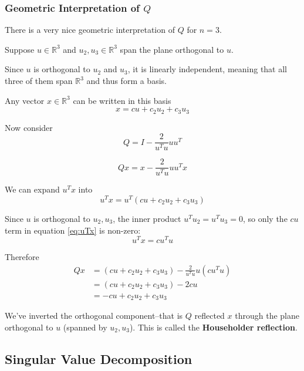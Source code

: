 \documentclass[12pt,letterpaper]{article}
\newcommand{\R}{\mathbb{R}}
\begin{document}
\subsubsection{Geometric Interpretation of $Q$}
There is a very nice geometric interpretation of $Q$ for $n=3$.

Suppose $u \in \R^3$ and $u_2, u_3 \in \R^3$ span the plane orthogonal to $u$.

Since $u$ is orthogonal to $u_2$ and $u_3$, it is linearly independent, meaning that all three of them span $\R^3$ and thus form a basis.

Any vector $x \in \R^3$ can be written in this basis
\begin{equation}
	x = c u + c_2 u_2 + c_3 u_3
\end{equation}

Now consider
\begin{equation}
	Q = I - \frac{2}{u^T u} u u^T
\end{equation}

\begin{equation}
	Qx = x - \frac{2}{u^T u} u u^T x
\end{equation}

We can expand $u^T x$ into
\begin{equation} \label{eq:uTx}
	u^T x = u^T (c u + c_2 u_2 + c_3 u_3)
\end{equation}

Since $u$ is orthogonal to $u_2, u_3$, the inner product $u^T u_2 = u^T u_3 = 0$, so only the $cu$ term in equation \ref{eq:uTx} is non-zero:
\begin{equation}
	u^T x = c u^T u
\end{equation}

Therefore
\begin{align}
	Qx &= (cu + c_2 u_2 + c_3 u_3) - \frac{2}{u^T u} u (c u^T u) \\
	&= (cu + c_2 u_2 + c_3 u_3) - 2 c u \\
	&= -cu + c_2 u_2 + c_3 u_3
\end{align}

We've inverted the orthogonal component--that is $Q$ reflected $x$ through the plane orthogonal to $u$ (spanned by $u_2, u_3$). This is called the \textbf{Householder reflection}.

\subsection{Singular Value Decomposition}
\end{document}
